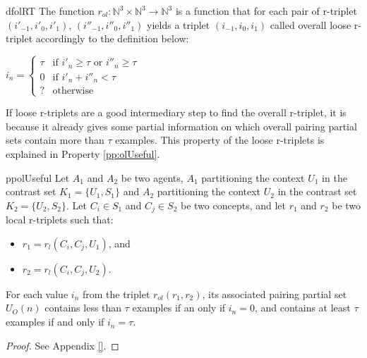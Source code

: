 \begin{restatable}{df}{olRT}
\label{def:olRTriplet}
The function $r_{ol}: \mathbb{N}^{3} \times \mathbb{N}^{3} \rightarrow  \mathbb{N}^{3}$ is a function that for each pair of r-triplet $(i'_{-1}, i'_{0}, i'_{1})$, $(i''_{-1}, i''_{0}, i''_{1})$ yields a triplet $(i_{-1},i_{0},i_{1})$ called overall loose r-triplet accordingly to the definition below:

\begin{center}
    $i_{n} = \left\{
	\begin{array}{lll}
		\tau & \mbox{if } i'_{n} \geq \tau \mbox{ or } i''_{n} \geq \tau \\
		0    & \mbox{if } i'_{n} + i''_{n} < \tau \\
		? & \mbox{otherwise}
	\end{array}
\right.$
\end{center}

\end{restatable}

If loose r-triplets are a good intermediary step to find the overall r-triplet, it is because it already gives some partial information on which overall pairing partial sets contain more than $\tau$ examples. This property of the loose r-triplets is explained in Property \ref{pp:olUseful}.

\begin{restatable}{pp}{olUseful}
\label{pp:olUseful}
Let $A_{1}$ and $A_{2}$ be two  agents, $A_{1}$ partitioning the context $U_{1}$ in the contrast set $K_{1} = \{ U_{1}, S_{1} \}$ and $A_{2}$ partitioning the context $U_{2}$ in the contrast set $K_{2} = \{ U_{2}, S_{2}\}$. Let $C_{i} \in S_{1}$ and $C_{j} \in S_{2}$ be two concepts, and let $r_{1}$ and $r_{2}$ be two local r-triplets such that:

\begin{itemize}
    \item $r_{1} = r_{l}(C_{i}, C_{j}, U_{1})$, and
    \item $r_{2} = r_{l}(C_{i}, C_{j}, U_{2})$.
\end{itemize}

For each value $i_{n}$ from the triplet $r_{ol}(r_{1},r_{2})$, its associated pairing partial set $U_{O}(n)$ contains less than $\tau$ examples if an only if $i_{n} = 0$, and contains at least $\tau$ examples if and only if $i_{n} = \tau$.
\end{restatable}

\begin{proof}
See Appendix \ref{}.
\end{proof}

